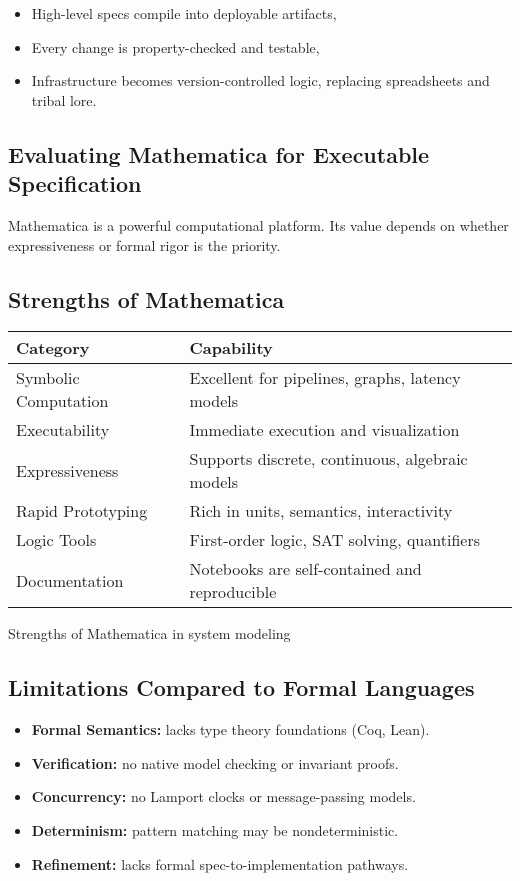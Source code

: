 \documentclass[../../../OAE-SPEC-MAIN.tex]{subfiles}
\begin{document}
\begin{itemize}
  \item High-level specs compile into deployable artifacts,
  \item Every change is property-checked and testable,
  \item Infrastructure becomes version-controlled logic, replacing spreadsheets and tribal lore.
\end{itemize}

\subsection*{Evaluating Mathematica for Executable Specification}

Mathematica is a powerful computational platform. Its value depends on whether expressiveness or formal rigor is the priority.

\subsection{Strengths of Mathematica}

\begin{marginfigure}[+80mm]
\scriptsize
\begin{tabularx}{\linewidth}{@{}lX@{}}
\toprule
\textbf{Category} & \textbf{Capability} \\
\midrule
Symbolic Computation & Excellent for pipelines, graphs, latency models \\
Executability & Immediate execution and visualization \\
Expressiveness & Supports discrete, continuous, algebraic models \\
Rapid Prototyping & Rich in units, semantics, interactivity \\
Logic Tools & First-order logic, SAT solving, quantifiers \\
Documentation & Notebooks are self-contained and reproducible \\
\bottomrule
\end{tabularx}
\caption{Strengths of Mathematica in system modeling}
\end{marginfigure}

\subsection*{Limitations Compared to Formal Languages}

\begin{itemize}
  \item \textbf{Formal Semantics:} lacks type theory foundations (Coq, Lean).
  \item \textbf{Verification:} no native model checking or invariant proofs.
  \item \textbf{Concurrency:} no Lamport clocks or message-passing models.
  \item \textbf{Determinism:} pattern matching may be nondeterministic.
  \item \textbf{Refinement:} lacks formal spec-to-implementation pathways.
\end{itemize}
\end{document}
